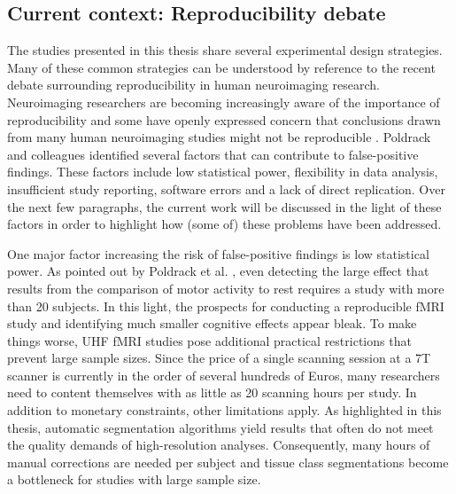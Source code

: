 \subsection{Current context: Reproducibility debate}
The studies presented in this thesis share several experimental design strategies. Many of these common strategies can be understood by reference to the recent debate surrounding reproducibility in human neuroimaging research. Neuroimaging researchers are becoming increasingly aware of the importance of reproducibility and some have openly expressed concern that conclusions drawn from many human neuroimaging studies might not be reproducible \parencite{Poldrack2017a}. Poldrack and colleagues \parencite*{Poldrack2017a} identified several factors that can contribute to false-positive findings. These factors include low statistical power, flexibility in data analysis, insufficient study reporting, software errors and a lack of direct replication. Over the next few paragraphs, the current work will be discussed in the light of these factors in order to highlight how (some of) these problems have been addressed.

One major factor increasing the risk of false-positive findings is low statistical power. As pointed out by Poldrack et al. \parencite*{Poldrack2017a}, even detecting the large effect that results from the comparison of motor activity to rest requires a study with more than 20 subjects. In this light, the prospects for conducting a reproducible fMRI study and identifying much smaller cognitive effects appear bleak. To make things worse, UHF fMRI studies pose additional practical restrictions that prevent large sample sizes. Since the price of a single scanning session at a 7T scanner is currently in the order of several hundreds of Euros, many researchers need to content themselves with as little as 20 scanning hours per study. In addition to monetary constraints, other limitations apply. As highlighted in this thesis, automatic segmentation algorithms yield results that often do not meet the quality demands of high-resolution analyses. Consequently, many hours of manual corrections are needed per subject and tissue class segmentations become a bottleneck for studies with large sample size.

